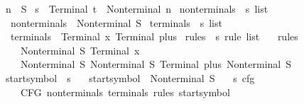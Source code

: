 \begin{isabellebody}
\ n\ {\isacharequal}{\kern0pt}\ S\isanewline
{}\isamarkupfalse%
\ s\ {\isacharequal}{\kern0pt}\ Terminal\ t\ {\isacharbar}{\kern0pt}\ Nonterminal\ n\isanewline
\isanewline
{}\isamarkupfalse%
\ nonterminals\ {\isacharcolon}{\kern0pt}{\isacharcolon}{\kern0pt}\ {\isachardoublequoteopen}s\ list{\isachardoublequoteclose}\ \isanewline
\ \ {\isachardoublequoteopen}nonterminals\ {\isacharequal}{\kern0pt}\ {\isacharbrackleft}{\kern0pt}Nonterminal\ S{\isacharbrackright}{\kern0pt}{\isachardoublequoteclose}\isanewline
\isanewline
{}\isamarkupfalse%
\ terminals\ {\isacharcolon}{\kern0pt}{\isacharcolon}{\kern0pt}\ {\isachardoublequoteopen}s\ list{\isachardoublequoteclose}\ \isanewline
\ \ {\isachardoublequoteopen}terminals\ {\isacharequal}{\kern0pt}\ {\isacharbrackleft}{\kern0pt}Terminal\ x{\isacharcomma}{\kern0pt}\ Terminal\ plus{\isacharbrackright}{\kern0pt}{\isachardoublequoteclose}\isanewline
\isanewline
{}\isamarkupfalse%
\ rules\ {\isacharcolon}{\kern0pt}{\isacharcolon}{\kern0pt}\ {\isachardoublequoteopen}s\ rule\ list{\isachardoublequoteclose}\ \isanewline
\ \ {\isachardoublequoteopen}rules\ {\isacharequal}{\kern0pt}\ {\isacharbrackleft}{\kern0pt}\isanewline
\ \ \ \ {\isacharparenleft}{\kern0pt}Nonterminal\ S{\isacharcomma}{\kern0pt}\ {\isacharbrackleft}{\kern0pt}Terminal\ x{\isacharbrackright}{\kern0pt}{\isacharparenright}{\kern0pt}{\isacharcomma}{\kern0pt}\isanewline
\ \ \ \ {\isacharparenleft}{\kern0pt}Nonterminal\ S{\isacharcomma}{\kern0pt}\ {\isacharbrackleft}{\kern0pt}Nonterminal\ S{\isacharcomma}{\kern0pt}\ Terminal\ plus{\isacharcomma}{\kern0pt}\ Nonterminal\ S{\isacharbrackright}{\kern0pt}{\isacharparenright}{\kern0pt}\isanewline
\ \ {\isacharbrackright}{\kern0pt}{\isachardoublequoteclose}\isanewline
\isanewline
{}\isamarkupfalse%
\ start{\isacharunderscore}{\kern0pt}symbol\ {\isacharcolon}{\kern0pt}{\isacharcolon}{\kern0pt}\ s\ \isanewline
\ \ {\isachardoublequoteopen}start{\isacharunderscore}{\kern0pt}symbol\ {\isacharequal}{\kern0pt}\ Nonterminal\ S{\isachardoublequoteclose}\isanewline
\isanewline
{}\isamarkupfalse%
\ {\isasymG}\ {\isacharcolon}{\kern0pt}{\isacharcolon}{\kern0pt}\ {\isachardoublequoteopen}s\ cfg{\isachardoublequoteclose}\ \isanewline
\ \ {\isachardoublequoteopen}{\isasymG}\ {\isacharequal}{\kern0pt}\ CFG\ nonterminals\ terminals\ rules\ start{\isacharunderscore}{\kern0pt}symbol{\isachardoublequoteclose}\isanewline
\isanewline

\end{isabellebody}

